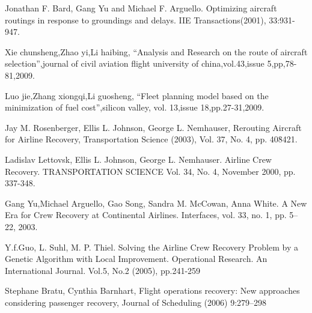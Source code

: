 \documentclass[runningheads]{llncs}
\begin{document}
\begin{thebibliography}{8}
Jonathan F. Bard, Gang Yu and Michael F. Arguello. Optimizing aircraft routings in response to groundings and delays. IIE Transactions(2001), 33:931-947. 

Xie chunsheng,Zhao yi,Li haibing, “Analysis and Research on the route of aircraft selection”,journal of civil aviation flight university of china,vol.43,issue 5,pp,78-81,2009.  

Luo jie,Zhang xiongqi,Li guosheng, “Fleet planning model based on the minimization of fuel cost”,silicon valley, vol. 13,issue 18,pp.27-31,2009. 

Jay M. Rosenberger, Ellis L. Johnson, George L. Nemhauser, Rerouting Aircraft for Airline Recovery, Transportation Science (2003), Vol. 37, No. 4, pp. 408̄421. 

Ladislav Lettovsk, Ellis L. Johnson, George L. Nemhauser. Airline Crew Recovery. TRANSPORTATION SCIENCE Vol. 34, No. 4, November 2000, pp. 337-348. 

Gang Yu,Michael Arguello, Gao Song, Sandra M. McCowan, Anna White. A New Era for Crew Recovery at Continental Airlines. Interfaces, vol. 33, no. 1, pp. 5–22, 2003. 

Y.f.Guo, L. Suhl, M. P. Thiel. Solving the Airline Crew Recovery Problem by a Genetic Algorithm with Local Improvement. Operational Research. An International Journal. Vol.5, No.2 (2005), pp.241-259 

Stephane Bratu, Cynthia Barnhart, Flight operations recovery: New approaches considering passenger recovery, Journal of Scheduling (2006) 9:279–298 








\end{thebibliography}
\end{document}
